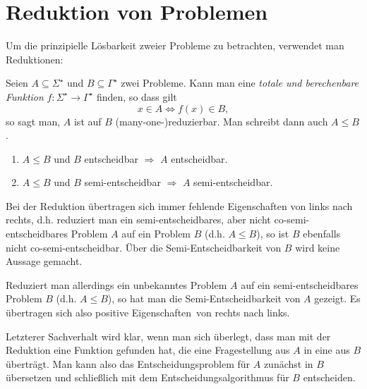 \section{Reduktion von Problemen}\label{sec:reduktion}
Um die prinzipielle Lösbarkeit zweier Probleme zu betrachten, verwendet man Reduktionen:

Seien $A\subseteq \Sigma^\star$ und $B\subseteq \Gamma^\star$ zwei Probleme. Kann man eine \emph{totale und berechenbare Funktion} $f:\Sigma^\star\rightarrow\Gamma^\star$ finden, so dass gilt
\begin{equation*}
	x\in A\Leftrightarrow f(x)\in B,
\end{equation*}
so sagt man, $A$ ist auf $B$ (many-one-)reduzierbar.
Man schreibt dann auch $A\leq B$.

\begin{enumerate}
	\item $A\leq B$ und $B$ entscheidbar $\Rightarrow$ $A$ entscheidbar.
	\item $A\leq B$ und $B$ semi-entscheidbar $\Rightarrow$ $A$ semi-entscheidbar.
\end{enumerate}

Bei der Reduktion übertragen sich immer fehlende Eigenschaften von links nach rechts, d.h. reduziert man ein semi-entscheidbares, aber nicht co-semi-entscheidbares Problem $A$ auf ein Problem $B$ (d.h. $A\leq B$), so ist $B$ ebenfalls nicht co-semi-entscheidbar. Über die Semi-Entscheidbarkeit von $B$ wird keine Aussage gemacht.

Reduziert man allerdings ein unbekanntes Problem $A$ auf ein semi-entscheidbares Problem $B$ (d.h. $A\leq B$), so hat man die Semi-Entscheidbarkeit von $A$ gezeigt. Es übertragen sich also \glqq positive Eigenschaften\grqq\  von rechts nach links.

Letzterer Sachverhalt wird klar, wenn man sich überlegt, dass man mit der Reduktion eine Funktion gefunden hat, die eine Fragestellung aus $A$ in eine aus $B$ überträgt. Man kann also das Entscheidungsproblem für $A$ zunächst in $B$ übersetzen und schließlich mit dem Entscheidungsalgorithmus für $B$ entscheiden.
